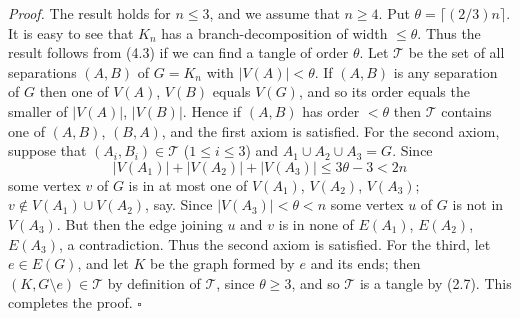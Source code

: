 \textit{Proof.} The result holds for $n \le 3$, and we assume that $n \ge 4$. Put $\theta = \lceil(2/3) n\rceil$. It is easy to see that $K_n$ has a branch-decomposition of width $\le \theta$. Thus the result follows from (4.3) if we can find a tangle of order $\theta$. Let $\mathscr{T}$ be the set of all separations $(A, B)$ of $G = K_n$ with $|V(A)| < \theta$. If $(A, B)$ is any separation of $G$ then one of $V(A)$, $V(B)$ equals $V(G)$, and so its order equals the smaller of $|V(A)|$, $|V(B)|$. Hence if $(A, B)$ has order $< \theta$ then $\mathscr{T}$ contains one of $(A, B)$, $(B, A)$, and the first axiom is satisfied. For the second axiom, suppose that $(A_i, B_i) \in \mathscr{T}$ ($1 \le i \le 3$) and $A_1 \cup A_2 \cup A_3 = G$. Since
\begin{equation*}
|V(A_1)| + |V(A_2)| + |V(A_3)| \le 3\theta - 3 < 2n
\end{equation*}
some vertex $v$ of $G$ is in at most one of $V(A_1)$, $V(A_2)$, $V(A_3)$; $v \notin V(A_1) \cup V(A_2)$, say. Since $|V(A_3)| < \theta < n$ some vertex $u$ of $G$ is not in $V(A_3)$. But then the edge joining $u$ and $v$ is in none of $E(A_1)$, $E(A_2)$, $E(A_3)$, a contradiction. Thus the second axiom is satisfied. For the third, let $e \in E(G)$, and let $K$ be the graph formed by $e$ and its ends; then $(K, G \setminus e) \in \mathscr{T}$ by definition of $\mathscr{T}$, since $\theta \ge 3$, and so $\mathscr{T}$ is a tangle by (2.7). This completes the proof. $\square$
